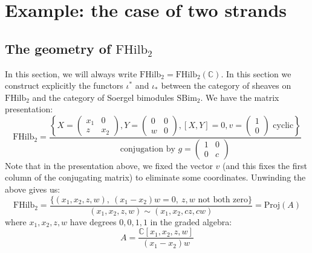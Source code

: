 \documentclass[12pt]{amsart}
\numberwithin{equation}{section}
\newtheorem{proposition}[theorem]{Proposition}
\theoremstyle{definition}
\theoremstyle{remark}
\newcommand{\CC}{\mathbb{C}}
\renewcommand{\1}{\mathbf{1}}
\newcommand{\FH}{\mathrm{FHilb}}
\newcommand{\proj}{\mathrm{Proj}}
\newcommand{\SBim}{\mathrm{SBim}}
\begin{document}



\section{Example: the case of two strands}
\label{sec:n=2}

\subsection{The geometry of $\FH_2$}
\label{sub:fh 2}

In this section, we will always write $\FH_2 = \FH_2(\CC)$. In this section we construct explicitly the functors $\iota^*$ and $\iota_*$ between the category of sheaves on $ \FH_2 $ and the category of Soergel bimodules $\SBim_2$. We have the matrix presentation:
$$
\FH_2 = \frac {\left\{ X = \left( \begin{array}{cc}
x_1 & 0 \\
z & x_2 \end{array} \right), Y = \left( \begin{array}{cc}
0 & 0 \\
w & 0 \end{array} \right),[X,Y]=0, v = \left( \begin{array}{cc}
1 \\
0 \end{array} \right) \text{ cyclic} \right\} }{ \text{conjugation by } g = \left( \begin{array}{cc}
1 & 0 \\
0 & c \end{array} \right)}
$$
Note that in the presentation above, we fixed the vector $v$ (and this fixes the first column of the conjugating matrix) to eliminate some coordinates. Unwinding the above gives us:
\begin{equation}
\label{eqn:matrix fh 2}
\FH_2 = \frac {\{(x_1,x_2,z,w), \ (x_1-x_2)w = 0, \ z,w \text{ not both zero} \}}{(x_1,x_2,z,w) \sim (x_1,x_2,cz,cw)} = \proj(A)
\end{equation}
where $x_1,x_2,z,w$ have degrees $0,0,1,1$ in the graded algebra:
\begin{equation}
\label{eqn:functions on fh 2}
A = \frac{\CC[x_1,x_2,z,w]}{(x_1-x_2)w} 
\end{equation}
\end{document}
